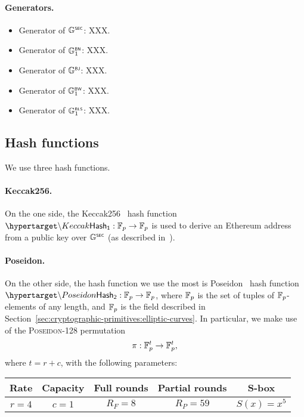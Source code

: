 \paragraph{Generators.}
\begin{itemize}
	\item Generator of ${\mathbb{G}}^{\text{\tiny \sf SEC}}$: XXX.
	\item Generator of ${\mathbb{G}}^{\text{\tiny \sf BN}}_1$: XXX.
	\item Generator of ${\mathbb{G}}^{\text{\tiny \sf BJ}}$: XXX.
	\item Generator of ${\mathbb{G}}^{\text{\tiny \sf BW}}_1$: XXX.
	\item Generator of ${\mathbb{G}}^{\text{\tiny \sf BLS}}_1$: XXX.
\end{itemize}

\subsection{Hash functions}
\label{sec:cryptographic-primitives:hash}


We use three hash functions. 

\paragraph{Keccak256.} On the one side, the Keccak256~\cite{bertoni11keccak} hash function $\hlset{\Keccak} : \F_p \rightarrow \F_p$ is used to derive an Ethereum address from a public key over ${\mathbb{G}}^{\text{\tiny \sf SEC}}$ (as described in~\cite{wood2014ethereum}).

\paragraph{Poseidon.} On the other side, the hash function we use the most is Poseidon~\cite{grassi21poseidon} hash function $\hlset{\Poseidon} : \F_p \rightarrow \F_p$, where $\mathbb{F}_p$ is the set of tuples of $\mathbb{F}_p$-elements of any length, and $\mathbb{F}_p$ is the field described in Section~\ref{sec:cryptographic-primitives:elliptic-curves}. In particular, we make use of the \textsc{Poseidon-128} permutation \[\pi: \mathbb{F}_p^t\rightarrow \mathbb{F}_p^t,\] where $t=r+c$, with the following parameters:
\begin{table}[H]
	\begin{center}
		\begin{tabular}{| c | c | c | c | c | }
			\hline
			Rate & Capacity  & Full rounds & Partial rounds & S-box \\
			\hline
			$r=4$ & $c=1$ & $R_F=8$ & $R_P=59$ & $S(x)=x^5$ \\
			\hline		
		\end{tabular}
	\end{center}
\end{table}

